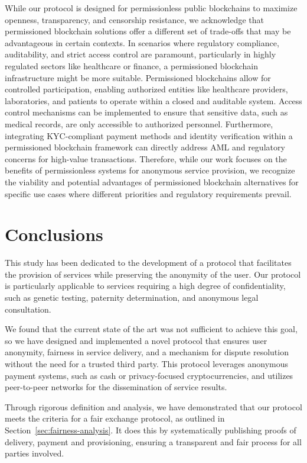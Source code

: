 \documentclass[pdftex,twocolumn,epjc3]{svjour3}
\begin{document}
\begin{sloppypar}
While our protocol is designed for permissionless public blockchains to maximize openness, transparency, and censorship resistance, we acknowledge that permissioned blockchain solutions offer a different set of trade-offs that may be advantageous in certain contexts. In scenarios where regulatory compliance, auditability, and strict access control are paramount, particularly in highly regulated sectors like healthcare or finance, a permissioned blockchain infrastructure might be more suitable. Permissioned blockchains allow for controlled participation, enabling authorized entities like healthcare providers, laboratories, and patients to operate within a closed and auditable system. Access control mechanisms can be implemented to ensure that sensitive data, such as medical records, are only accessible to authorized personnel. Furthermore, integrating KYC-compliant payment methods and identity verification within a permissioned blockchain framework can directly address AML and regulatory concerns for high-value transactions. Therefore, while our work focuses on the benefits of permissionless systems for anonymous service provision, we recognize the viability and potential advantages of permissioned blockchain alternatives for specific use cases where different priorities and regulatory requirements prevail.
\end{sloppypar}

\section{Conclusions}\label{sec:conclusion}

This study has been dedicated to the development of a protocol that facilitates the provision of services while preserving the anonymity of the user. Our protocol is particularly applicable to services requiring a high degree of confidentiality, such as genetic testing, paternity determination, and anonymous legal consultation.

We found that the current state of the art was not sufficient to achieve this goal, so we have designed and implemented a novel protocol that ensures user anonymity, fairness in service delivery, and a mechanism for dispute resolution without the need for a trusted third party. This protocol leverages anonymous payment systems, such as cash or privacy-focused cryptocurrencies, and utilizes peer-to-peer networks for the dissemination of service results.

\begin{sloppypar}
Through rigorous definition and analysis, we have demonstrated that our protocol meets the criteria for a fair exchange protocol, as outlined in Section~\ref{sec:fairness-analysis}. It does this by systematically publishing proofs of delivery, payment and provisioning, ensuring a transparent and fair process for all parties involved.
\end{sloppypar}
\end{document}
